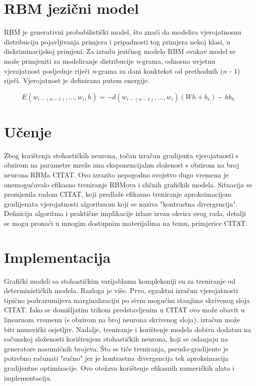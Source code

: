 \documentclass[times, utf8, diplomski, numeric]{fer}
\begin{document}
\section{RBM jezični model}

RBM je generativni probabilistički model, što znači da modelira vjerojatnosnu distribuciju pojavljivanja primjera i pripadnosti tog primjera nekoj klasi, u diskriminacijskoj primjeni. Za izradu jezičnog modela RBM ovakav model se može primjeniti za modeliranje distribucije \textit{n}-grama, odnosno uvjetnu vjerojatnost posljednje riječi \textit{n}-grama za dani konktekst od prethodnih ($n$ - 1) riječi. Vjerojatnost je definirana putem energije.

\[
E(w_{i - (n - 1)}, ... , w_i, h) =  - d(w_{i - (n - 1)}, ... , w_i) (W h + b_v) - h b_h
\]

\section{Učenje}

Zbog korištenja stohastičkih neurona, točan izračun gradijenta vjerojatnosti s obzirom na parametre mreže ima eksponencijalnu složenost s obzirom na broj neurona RBMa CITAT. Ovo izrazito nepogodno svojstvo dugo vremena je onemogućavalo efikasno treniranje RBMova i sličnih grafičkih modela. Situacija se promjenila radom CITAT, koji predlaže efikasno treniranje aproksimacijom gradijenata vjerojatnosti algoritmom koji se naziva "kontrastna divergencija". Definicija algoritma i praktične implikacije izlaze izvan okvira ovog rada, detalji se mogu pronaći u mnogim dostupnim materijalima na temu, primjerice CITAT.

\section{Implementacija}

Grafički modeli sa stohastičkim varijablama kompleksniji su za treniranje od determinističkih modela. Razloga je više. Prvo, egzaktni izračun vjerojatnosti tipično podrazumijeva marginalizaciju po sivm mogućim stanjima skrivenog sloja CITAT. Iako se domišljatim trikom predstavljenim u CITAT ovo može obavit u linearnom vremenu (s obzirom na broj neurona skrivenog sloja), izračun može biti numerički osjetljiv. Nadalje, treniranje i korištenje modela dobiva dodatnu na računskoj složenosti korištenjem stohastičkih neurona, koji se oslanjaju na generatore nasumičnih brojeva. Što se tiče treniranja, pseudo-gradijente je potrebno računati "ručno" jer je kontrastna divergencija tek aproksimacija gradijentne optimizacije. Ovo otežava korištenje efikasnih numeričkih alata i implementaciju.
\end{document}
